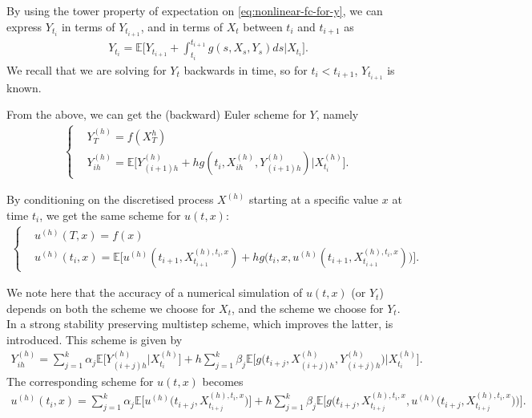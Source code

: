 \documentclass{article}  %
\begin{document}
By using the tower property of expectation on \autoref{eq:nonlinear-fc-for-y}, we can express $Y_{t_i}$ in terms of $Y_{t_{i+1}}$, and in terms of $X_t$ between $t_i$ and $t_{i+1}$ as
%
\begin{align} 
    Y_{t_i} = \mathbb{E}\bigg[ Y_{t_{i+1}} + \int_{t_{i}}^{t_{i+1}}g(s,X_s,Y_s)ds \Big\lvert X_{t_i} \bigg].
\end{align}
%
We recall that we are solving for $Y_t$ backwards in time, so for $t_i < t_{i+1}$, $Y_{t_{i+1}}$ is known.

From the above, we can get the (backward) Euler scheme for $Y$, namely
%
\begin{align} %
    \begin{cases}
    &Y_T^{(h)} = f(X_T^{h})\\
    &Y_{ih}^{(h)} = \mathbb{E}\bigg[ Y_{(i+1)h}^{(h)} + h g(t_i,X_{ih}^{(h)},Y_{(i+1)h}^{(h)}) \Big\lvert X_{t_i}^{(h)} \bigg].
    \end{cases}
\end{align}
%

By conditioning on the discretised process $X^{(h)}$ starting at a specific value $x$ at time $t_i$, we get the same scheme for $u(t,x)$:
%
\begin{align}
    \begin{cases}
    &u^{(h)}(T,x) = f(x)\\
    &u^{(h)}(t_i,x) = \mathbb{E}\bigg[ u^{(h)}(t_{i+1},X^{(h),t_i,x}_{t_{i+1}}) + h g\big( t_i,x,u^{(h)}(t_{i+1},X^{(h),t_i,x}_{t_{i+1}}) \big) \bigg]. 
    \end{cases}
\end{align} 
%

We note here that the accuracy of a numerical simulation of $u(t,x)$ (or $Y_t$) depends on both the scheme we choose for $X_t$, and the scheme we choose for $Y_t$. In \cite{fang2023strong} a strong stability preserving multistep scheme, which improves the latter, is introduced. This scheme is given by
%
\begin{align} %
    Y_{ih}^{(h)} = \sum_{j=1}^{k} \alpha_j \mathbb{E}\bigg[ Y_{(i+j)h}^{(h)} \Big\lvert X_{t_i}^{(h)} \bigg] + h \sum_{j=1}^{k} \beta_j \mathbb{E}\bigg[ g\big(t_{i+j},X_{(i+j)h}^{(h)},Y_{(i+j)h}^{(h)}\big) \Big\lvert X_{t_i}^{(h)} \bigg].
\end{align}
%
The corresponding scheme for $u(t,x)$ becomes
%
\begin{align} 
    u^{(h)}(t_i,x) = \sum_{j=1}^{k} \alpha_j \mathbb{E}\bigg[ u^{(h)}\Big(t_{i+j},X_{t_{i+j}}^{(h),t_i,x}\Big) \bigg] + h \sum_{j=1}^{k} \beta_j \mathbb{E}\bigg[ g\Big(t_{i+j},X_{t_{i+j}}^{(h),t_i,x},u^{(h)}\big(t_{i+j},X_{t_{i+j}}^{(h),t_i,x}\big)\Big) \bigg].
\end{align}
%
\end{document}
